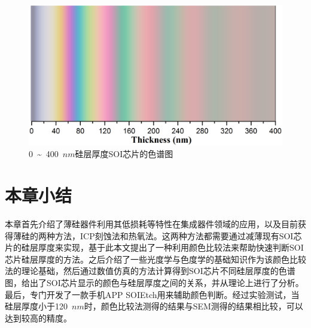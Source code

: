 \begin{figure}[htb]
	\centering
	\includegraphics[width=13cm]{./Pictures/color_400nm.jpg}
	\captionsetup{justification=centering}
	\caption{0~\~{}~400~$nm$硅层厚度SOI芯片的色谱图}
	\label{color_400nm}
\end{figure}

\section{本章小结}

本章首先介绍了薄硅器件利用其低损耗等特性在集成器件领域的应用，以及目前获得薄硅的两种方法，ICP刻蚀法和热氧法。这两种方法都需要通过减薄现有SOI芯片的硅层厚度来实现，基于此本文提出了一种利用颜色比较法来帮助快速判断SOI芯片硅层厚度的方法。之后介绍了一些光度学与色度学的基础知识作为该颜色比较法的理论基础，然后通过数值仿真的方法计算得到SOI芯片不同硅层厚度的色谱图，给出了SOI芯片显示的颜色与硅层厚度之间的关系，并从理论上进行了分析。最后，专门开发了一款手机APP SOIEtch用来辅助颜色判断。经过实验测试，当硅层厚度小于120~$nm$时，颜色比较法测得的结果与SEM测得的结果相比较，可以达到较高的精度。







